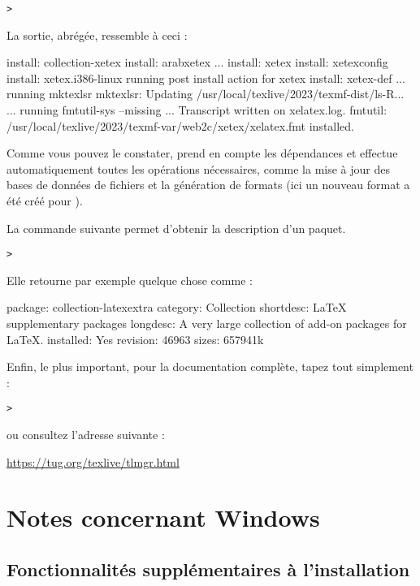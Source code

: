 \documentclass[german, english, french]{article}
\begin{document}
\begin{alltt}
> 
\end{alltt}
La sortie, abrégée, ressemble à ceci :
\begin{fverbatim}
install: collection-xetex
install: arabxetex
...
install: xetex
install: xetexconfig
install: xetex.i386-linux
running post install action for xetex
install: xetex-def
...
running mktexlsr
mktexlsr: Updating /usr/local/texlive/2023/texmf-dist/ls-R...
...
running fmtutil-sys --missing
...
Transcript written on xelatex.log.
fmtutil: /usr/local/texlive/2023/texmf-var/web2c/xetex/xelatex.fmt installed.
\end{fverbatim}
Comme vous pouvez le constater,  prend en compte les dépendances et
effectue automatiquement toutes les opérations nécessaires, comme la mise à jour
des bases de données de fichiers et la génération de formats (ici un nouveau
format a été créé pour \XeTeX).

La commande suivante permet d'obtenir la description d'un paquet.
\begin{alltt}
> 
\end{alltt}
Elle retourne par exemple quelque chose comme :
\begin{fverbatim}
package:    collection-latexextra
category:   Collection
shortdesc:  LaTeX supplementary packages
longdesc:   A very large collection of add-on packages for LaTeX.
installed:  Yes
revision:   46963
sizes:	    657941k
\end{fverbatim}

Enfin, le plus important, pour la documentation complète, tapez tout
simplement :
\begin{alltt}
> 
\end{alltt}
ou consultez l'adresse suivante :

\url{https://tug.org/texlive/tlmgr.html}

\section{Notes concernant Windows}
\label{sec:windows}

\subsection{Fonctionnalités supplémentaires à l'installation}
\label{sec:winfeatures}
\end{document}
